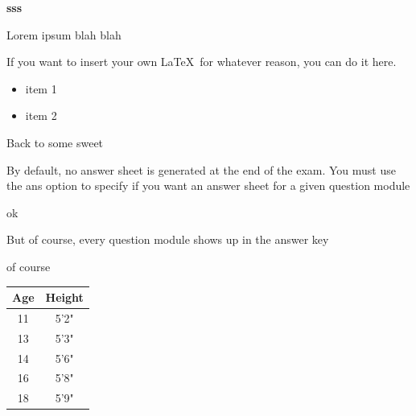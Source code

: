 \documentclass{exam}
\begin{document}
	\par\noindent \noindent\textbf{sss}
	\par \par\noindent Lorem ipsum blah blah
\\ [.2 in]
\par\noindent If you want to insert your own \LaTeX\ for whatever reason, you can do it here.
\par
\begin{itemize}
	\item item 1
	\item item 2
\end{itemize}
\begin{questions}
	\setcounter{question}{35}
	\question Back to some sweet
	\question By default, no answer sheet is generated at the end of the exam. You must use the ans option to specify if you want an answer sheet for a given question module
		\begin{solution}[36 pt]
		 ok
		\end{solution}
	\question But of course, every question module shows up in the answer key
		\begin{solution}[36 pt]
		 of course
		\end{solution}
\end{questions}
\begin{center}
\def\arraystretch{1.25}
\begin{tabular}{|c|c|}
\hline
	\textbf{Age} & \textbf{Height}\\
	\hline
	11 & 5'2"\\
	13 & 5'3"\\
	14 & 5'6"\\
	16 & 5'8"\\
	18 & 5'9"\\
\hline
\end{tabular}
\end{center}
\newpage
\end{document}
